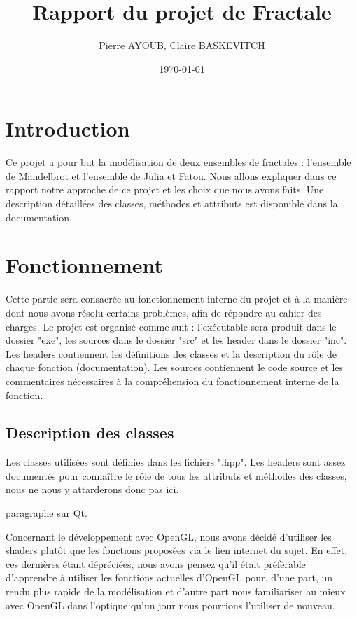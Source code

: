 \documentclass[11pt]{article}
\title{Rapport du projet de Fractale}
\author{Pierre AYOUB, Claire BASKEVITCH}
\date\today
\begin{document}
\maketitle

\section{Introduction}

Ce projet a pour but la modélisation de deux ensembles de fractales : 
l'ensemble de Mandelbrot et l'ensemble de Julia et Fatou.
Nous allons expliquer dans ce rapport notre approche de ce projet 
et les choix que nous avons faits.
Une description détaillées des classes, méthodes et attributs est 
disponible dans la documentation.

\section{Fonctionnement}

Cette partie sera consacrée au fonctionnement interne du projet
et à la manière dont nous avons résolu certains problèmes, afin de 
répondre au cahier des charges. Le projet est organisé comme suit : 
l'exécutable sera produit dans le dossier "exe", les sources dans le dossier "src"
et les header dans le dossier "inc".
Les headers contiennent les définitions des classes et la description du rôle
de chaque fonction (documentation). Les sources contiennent le code source
et les commentaires nécessaires à la compréhension du fonctionnement
interne de la fonction.

\subsection{Description des classes}

Les classes utilisées sont définies dans les fichiers ".hpp". Les headers 
sont assez documentés pour connaître le rôle de tous les attributs et 
méthodes des classes, nous ne nous y attarderons donc pas ici.


paragraphe sur Qt.


Concernant le développement avec OpenGL, nous avons décidé d'utiliser 
les shaders plutôt que les fonctions proposées via le lien internet du 
sujet. En effet, ces dernières étant dépréciées, nous avons pensez 
qu'il était préférable d'apprendre à utiliser les fonctions actuelles 
d'OpenGL pour, d'une part, un rendu plus rapide de la modélisation et 
d'autre part nous familiariser au mieux avec OpenGL dans l'optique 
qu'un jour nous pourrions l'utiliser de nouveau. 
\end{document}
